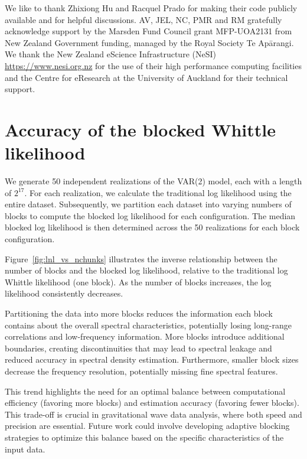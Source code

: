 \documentclass[%
 reprint,
 amsmath,amssymb,
 aps,
 nofootinbib,
]{revtex4-2}
\begin{document}
\begin{acknowledgments}
We like to thank Zhixiong Hu and Racquel Prado for making their code publicly available and for helpful discussions. AV,  JEL, NC, PMR and RM gratefully acknowledge support  by the Marsden Fund Council grant MFP-UOA2131 from New Zealand Government funding, managed by the Royal Society Te Apārangi. We thank the New Zealand eScience Infrastructure
(NeSI) \url{https://www.nesi.org.nz} for the use of their high performance computing facilities and
the Centre for eResearch at the University of Auckland for their technical
support.
\end{acknowledgments}


\appendix  


\section{Accuracy of the blocked  Whittle likelihood}
\label{appdx:blocked_lnl}

We generate 50 independent realizations of the VAR(2) model, each with a length of \(2^{17}\). 
For each realization, we calculate the traditional log likelihood using the entire dataset. 
Subsequently, we partition each dataset into varying numbers of blocks to compute the blocked log likelihood for each configuration. 
The median blocked log likelihood is then determined across the 50 realizations for each block configuration.

Figure~\ref{fig:lnl_vs_nchunks} illustrates the inverse relationship between the number of blocks and the blocked log likelihood, relative to the traditional log Whittle likelihood (one block). 
As the number of blocks increases, the log likelihood consistently decreases.

Partitioning the data into more blocks reduces the information each block contains about the overall spectral characteristics, potentially losing long-range correlations and low-frequency information. More blocks introduce additional boundaries, creating discontinuities that may lead to spectral leakage and reduced accuracy in spectral density estimation. Furthermore, smaller block sizes decrease the frequency resolution, potentially missing fine spectral features.

This trend highlights the need for an optimal balance between computational efficiency (favoring more blocks) and estimation accuracy (favoring fewer blocks). This trade-off is crucial in gravitational wave data analysis, where both speed and precision are essential. Future work could involve developing adaptive blocking strategies to optimize this balance based on the specific characteristics of the input data.
\end{document}
